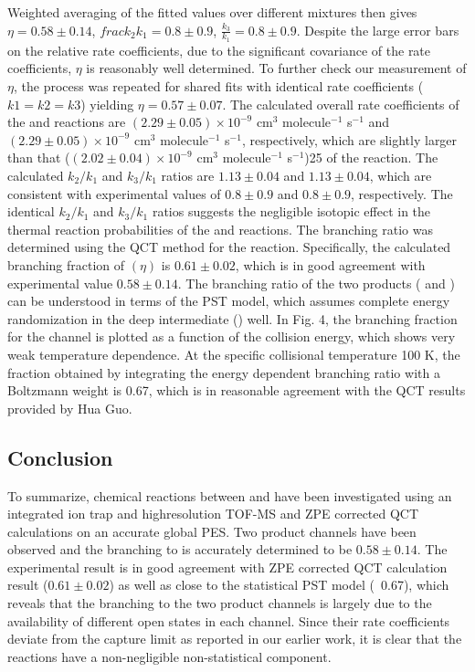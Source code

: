 Weighted averaging of the fitted values over different mixtures then gives $\eta = 0.58 \pm 0.14$, $frac{k_2}{k_1} = 0.8 \pm 0.9$, $\frac{k_3}{k_1} = 0.8 \pm 0.9$. Despite the large error bars on the relative rate coefficients, due to the significant covariance of the rate coefficients, $\eta$ is reasonably well determined. To further check our measurement of $\eta$, the process was repeated for shared fits with identical rate coefficients ($k1 = k2 = k3$) yielding $\eta = 0.57 \pm 0.07$. The calculated overall rate coefficients of the  and  reactions are $(2.29 \pm 0.05) \times 10^{-9}$ cm$^3$ molecule$^{-1}$ s$^{-1}$ and $(2.29 \pm 0.05) \times 10^{-9}$ cm$^3$ molecule$^{-1}$ s$^{-1}$, respectively, which are slightly larger than that ($(2.02 \pm 0.04) \times 10^{-9}$ cm$^3$ molecule$^{-1}$ s$^{-1}$)25 of the  reaction. The calculated $k_2/k_1$ and $k_3/k_1$ ratios are $1.13 \pm 0.04$ and $1.13 \pm 0.04$, which are consistent with experimental values of $0.8 \pm 0.9$ and $0.8 \pm 0.9$, respectively. The identical $k_2/k_1$ and $k_3/k_1$ ratios suggests the negligible isotopic effect in the thermal reaction probabilities of the  and  reactions. The branching ratio was determined using the QCT method for the  reaction. Specifically, the calculated branching fraction of  $(\eta)$ is $0.61 \pm 0.02$, which is in good agreement with experimental value $0.58 \pm 0.14$. The branching ratio of the two products ( and ) can be understood in terms of the PST model, which assumes complete energy randomization in the deep intermediate () well. In Fig. 4, the branching fraction for the  channel is plotted as a function of the collision energy, which shows very weak temperature dependence. At the specific collisional temperature 100 K, the fraction obtained by integrating the energy dependent branching ratio with a Boltzmann weight is 0.67, which is in reasonable agreement with the QCT results provided by Hua Guo.\cite{Chen2018}

\subsection{Conclusion}

To summarize, chemical reactions between  and  have been investigated using an integrated ion trap and highresolution TOF-MS and ZPE corrected QCT calculations on an accurate global PES. Two product channels have been observed and the branching to  is accurately determined to be $0.58 \pm 0.14$. The experimental result is in good agreement with ZPE corrected QCT calculation result ($0.61 \pm 0.02$) as well as close to the statistical PST model (~0.67), which reveals that the branching to the two product channels is largely due to the availability of different open states in each channel. Since their rate coefficients deviate from the capture limit as reported in our earlier work, it is clear that the  reactions have a non-negligible non-statistical component.